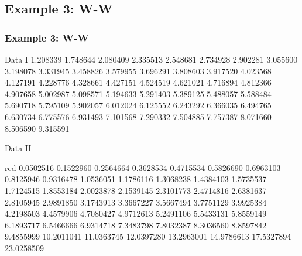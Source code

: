 \subsection{Example 3: W-W}
\begin{frame}
  \frametitle{Example 3: W-W}
\begin{footnotesize}
\begin{block}{Data I}
1.208339 1.748644 2.080409 2.335513 2.548681 2.734928 2.902281
3.055600 3.198078 3.331945 3.458826 3.579955 3.696291 3.808603
3.917520 4.023568 4.127191 4.228776 4.328661 4.427151 4.524519
4.621021 4.716894 4.812366 4.907658 5.002987 5.098571 5.194633
5.291403 5.389125 5.488057 5.588484 5.690718 5.795109 5.902057
6.012024 6.125552 6.243292 6.366035 6.494765 6.630734 6.775576
6.931493 7.101568 7.290332 7.504885 7.757387 8.071660 8.506590
9.315591
\end{block}

\begin{block}{Data II}
\begin{color}{red}
 0.0502516  0.1522960  0.2564664  0.3628534  0.4715534
 0.5826690  0.6963103  0.8125946  0.9316478  1.0536051
 1.1786116  1.3068238  1.4384103  1.5735537  1.7124515
 1.8553184  2.0023878  2.1539145  2.3101773  2.4714816
 2.6381637  2.8105945  2.9891850  3.1743913  3.3667227
 3.5667494  3.7751129  3.9925384  4.2198503  4.4579906
 4.7080427  4.9712613  5.2491106  5.5433131  5.8559149
 6.1893717  6.5466666  6.9314718  7.3483798  7.8032387
 8.3036560  8.8597842  9.4855999 10.2011041 11.0363745
12.0397280 13.2963001 14.9786613 17.5327894 23.0258509
\end{color}
\end{block}
\end{footnotesize}
\end{frame}



